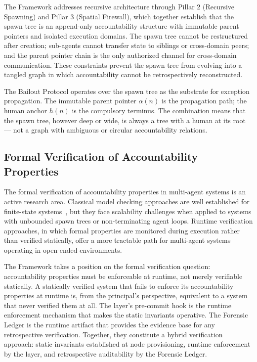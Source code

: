The \bxthree{} Framework addresses recursive architecture through Pillar 2 (Recursive Spawning) and Pillar 3 (Spatial Firewall), which together establish that the spawn tree is an append-only accountability structure with immutable parent pointers and isolated execution domains. The spawn tree cannot be restructured after creation; sub-agents cannot transfer state to siblings or cross-domain peers; and the parent pointer chain is the only authorized channel for cross-domain communication. These constraints prevent the spawn tree from evolving into a tangled graph in which accountability cannot be retrospectively reconstructed.

The Bailout Protocol operates over the spawn tree as the substrate for exception propagation. The immutable parent pointer $\alpha(n)$ is the propagation path; the human anchor $h(n)$ is the compulsory terminus. The combination means that the spawn tree, however deep or wide, is always a tree with a human at its root --- not a graph with ambiguous or circular accountability relations.

\subsection{Formal Verification of Accountability Properties}

The formal verification of accountability properties in multi-agent systems is an active research area. Classical model checking approaches are well established for finite-state systems~\cite{dijkstra1982}, but they face scalability challenges when applied to systems with unbounded spawn trees or non-terminating agent loops. Runtime verification approaches, in which formal properties are monitored during execution rather than verified statically, offer a more tractable path for multi-agent systems operating in open-ended environments.

The \bxthree{} Framework takes a position on the formal verification question: accountability properties must be enforceable at runtime, not merely verifiable statically. A statically verified system that fails to enforce its accountability properties at runtime is, from the principal's perspective, equivalent to a system that never verified them at all. The \fact{} layer's pre-commit hook is the runtime enforcement mechanism that makes the static invariants operative. The Forensic Ledger is the runtime artifact that provides the evidence base for any retrospective verification. Together, they constitute a hybrid verification approach: static invariants established at node provisioning, runtime enforcement by the \fact{} layer, and retrospective auditability by the Forensic Ledger.
